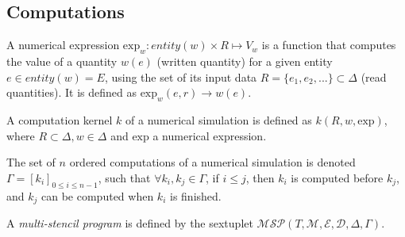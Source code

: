 \subsection{Computations}

\begin{mydef}
A numerical expression $\text{exp}_{w}: entity(w)\times R\mapsto V_{w}$ is a function that computes the value of a quantity $w(e)$ (written quantity) for a given entity $e \in entity(w)=E$, using the set of its input data $R=\{e_{1}, e_{2}, ...\} \subset \Delta$ (read quantities). It is defined as $\text{exp}_{w}(e,r) \rightarrow w(e)$.
\end{mydef}

\begin{mydef}
A computation kernel $k$ of a numerical simulation is defined as $k(R,w,\text{exp})$, where $R \subset \Delta, w \in \Delta$ and $\text{exp}$ a numerical expression. %
\end{mydef}

\begin{mydef}
The set of $n$ ordered computations of a numerical simulation is denoted $\Gamma = [k_i]_{0 \leq i \leq n-1}$, such that $\forall k_i,k_j \in \Gamma$, if $i \leq j$, then $k_i$ is computed before $k_j$, and $k_j$ can be computed when $k_i$ is finished.
\end{mydef}


\begin{mydef}
A \textit{multi-stencil program} is defined by the sextuplet $\mathcal{MSP}(T,\mathcal{M},\mathcal{E},\mathcal{D},\Delta,\Gamma)$.
\end{mydef}

